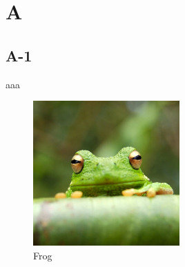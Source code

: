 \chapter{A}
\section{A-1}
aaa~\cite{sample}

\begin{figure}
    \centering
    \includegraphics[width=0.5\textwidth]{Figures/frog.jpg}
    \caption{Frog}
    \label{fig:frog}
\end{figure}